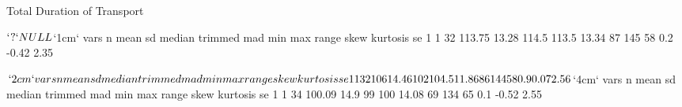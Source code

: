 \documentclass{article}
\begin{document}
Total Duration of Transport
\begin{Schunk}
\begin{Soutput}
$`?`
NULL

$`1cm`
  vars  n   mean    sd median trimmed   mad min max range skew kurtosis   se
1    1 32 113.75 13.28  114.5   113.5 13.34  87 145    58  0.2    -0.42 2.35

$`2cm`
  vars  n mean    sd median trimmed   mad min max range skew kurtosis   se
1    1 32  106 14.46    102   104.5 11.86  86 144    58  0.9     0.07 2.56

$`4cm`
  vars  n   mean   sd median trimmed   mad min max range skew kurtosis   se
1    1 34 100.09 14.9     99     100 14.08  69 134    65  0.1    -0.52 2.55
\end{Soutput}
\end{Schunk}
\end{document}
